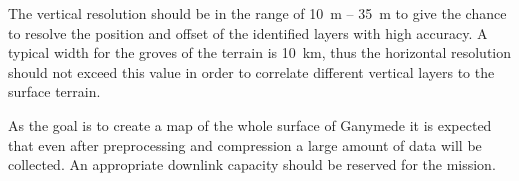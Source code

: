 The vertical resolution should be in the range of 10~m -- 35~m to
give the chance to resolve the position and offset of the identified
layers with high accuracy. A typical width for the groves of the terrain
is 10~km, thus the horizontal resolution should not exceed this value
in order to correlate different vertical layers to the surface terrain. 

As the goal is to create a map of the whole surface of Ganymede it
is expected that even after preprocessing and compression a large
amount of data will be collected. An appropriate downlink capacity
should be reserved for the mission.
